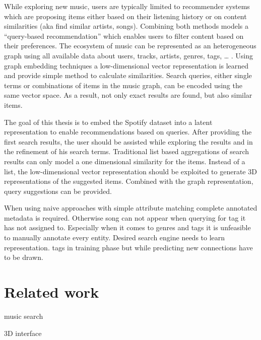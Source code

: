 \documentclass[a4paper]{llncs}
\begin{document}
	
	While exploring new music, users are typically limited to recommender systems which are proposing items either based on their listening history or on content similarities (aka find similar artists, songs). Combining both methods models a “query-based recommendation” which enables users to filter content based on their preferences.
	The ecosystem of music can be represented as an heterogeneous graph using all available data about users, tracks, artists, genres, tags, … . Using graph embedding techniques a low-dimensional vector representation is learned and provide simple method to calculate similarities. Search queries, either single terms or combinations of items in the music graph, can be encoded using the same vector space. As a result, not only exact results are found, but also similar items.
	
	The goal of this thesis is to embed the Spotify dataset into a latent representation to enable recommendations based on queries. After providing the first search results, the user should be assisted while exploring the results and in the refinement of his search terms. Traditional list based aggregations of search results can only model a one dimensional similarity for the items. Instead of a list, the low-dimensional vector representation should be exploited to generate 3D representations of the suggested items. Combined with the graph representation, query suggestions can be provided.
	

	
	When using naive approaches with simple attribute matching complete annotated metadata is required. Otherwise song can not appear when querying for tag it has not assigned to. Especially when it comes to genres and tags it is unfeasible to manually annotate every entity. 
	Desired search engine needs to learn representation. tags in training phase but while predicting new connections have to be drawn.


	
	\section{Related work}
	
	music search \cite{chen2016query}
	
	3D interface \cite{lamere2007using}
	
\end{document}
